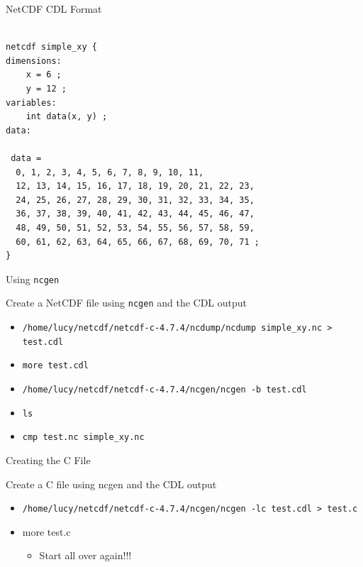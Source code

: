 \documentclass[compress,11pt,xcolor=svgnames,aspectratio=169]{beamer}
\begin{document}
\begin{frame}[fragile]{NetCDF CDL Format}

\footnotesize{

\begin{verbatim}

netcdf simple_xy {
dimensions:
	x = 6 ;
	y = 12 ;
variables:
	int data(x, y) ;
data:

 data =
  0, 1, 2, 3, 4, 5, 6, 7, 8, 9, 10, 11,
  12, 13, 14, 15, 16, 17, 18, 19, 20, 21, 22, 23,
  24, 25, 26, 27, 28, 29, 30, 31, 32, 33, 34, 35,
  36, 37, 38, 39, 40, 41, 42, 43, 44, 45, 46, 47,
  48, 49, 50, 51, 52, 53, 54, 55, 56, 57, 58, 59,
  60, 61, 62, 63, 64, 65, 66, 67, 68, 69, 70, 71 ;
}

\end{verbatim}

}

\end{frame}

\begin{frame}[fragile]{Using \texttt{ncgen}}

Create a NetCDF file using \verb|ncgen| and the CDL output

\begin{itemize}

  \item \verb|/home/lucy/netcdf/netcdf-c-4.7.4/ncdump/ncdump simple_xy.nc > test.cdl|
  \item \verb|more test.cdl|
  \item \verb|/home/lucy/netcdf/netcdf-c-4.7.4/ncgen/ncgen -b test.cdl|
  \item \verb|ls|
  \item \verb|cmp test.nc simple_xy.nc|

\end{itemize}

\end{frame}

\begin{frame}[fragile]{Creating the C File}

Create a C file using ncgen and the CDL output

\begin{itemize}

  \item \verb|/home/lucy/netcdf/netcdf-c-4.7.4/ncgen/ncgen -lc test.cdl > test.c|

  \item more test.c\\[0.7cm]

  \begin{itemize}
    \item \Large{Start all over again!!!}
  \end{itemize}

\end{itemize}

\end{frame}
\end{document}

